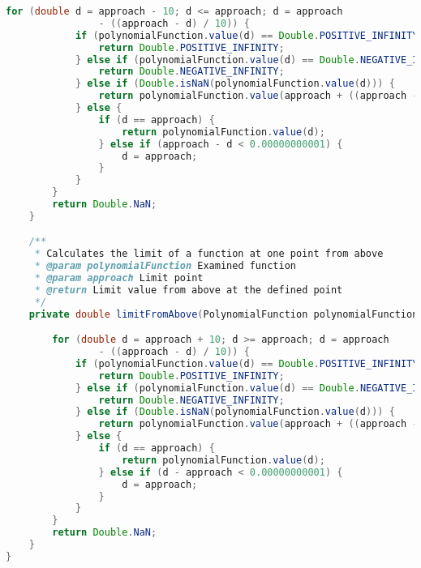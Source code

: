 \begin{lstlisting}[caption=Limes (Istogu),label=list:Limes,language=Java]
        for (double d = approach - 10; d <= approach; d = approach
                - ((approach - d) / 10)) {
            if (polynomialFunction.value(d) == Double.POSITIVE_INFINITY) {
                return Double.POSITIVE_INFINITY;
            } else if (polynomialFunction.value(d) == Double.NEGATIVE_INFINITY) {
                return Double.NEGATIVE_INFINITY;
            } else if (Double.isNaN(polynomialFunction.value(d))) {
                return polynomialFunction.value(approach + ((approach - d) * 10));
            } else {
                if (d == approach) {
                    return polynomialFunction.value(d);
                } else if (approach - d < 0.00000000001) {
                    d = approach;
                }
            }
        }
        return Double.NaN;
    }

    /**
     * Calculates the limit of a function at one point from above
     * @param polynomialFunction Examined function
     * @param approach Limit point
     * @return Limit value from above at the defined point
     */
    private double limitFromAbove(PolynomialFunction polynomialFunction, double approach) {

        for (double d = approach + 10; d >= approach; d = approach
                - ((approach - d) / 10)) {
            if (polynomialFunction.value(d) == Double.POSITIVE_INFINITY) {
                return Double.POSITIVE_INFINITY;
            } else if (polynomialFunction.value(d) == Double.NEGATIVE_INFINITY) {
                return Double.NEGATIVE_INFINITY;
            } else if (Double.isNaN(polynomialFunction.value(d))) {
                return polynomialFunction.value(approach + ((approach - d) * 10));
            } else {
                if (d == approach) {
                    return polynomialFunction.value(d);
                } else if (d - approach < 0.00000000001) {
                    d = approach;
                }
            }
        }
        return Double.NaN;
    }
}
\end{lstlisting}    


